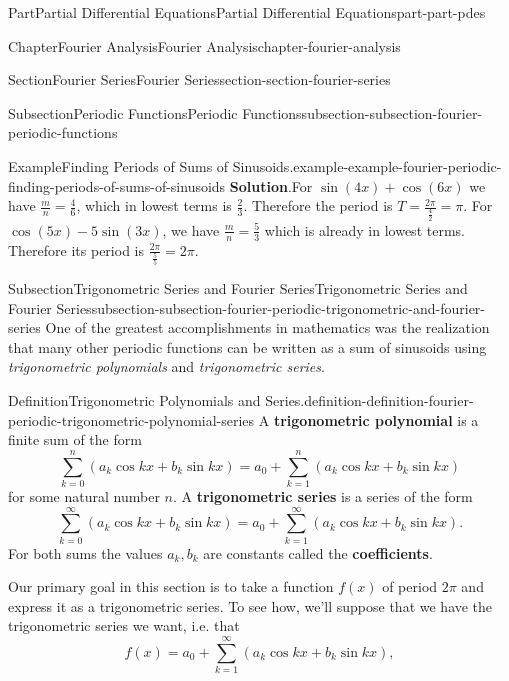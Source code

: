 \documentclass[twoside,10pt,]{book}
\newcommand{\blocktitlefont}{\relax}
\newcommand{\terminology}[1]{\textbf{#1}}
\numberwithin{equation}{part}
\begin{document}
\begin{partptx}{Part}{Partial Differential Equations}{}{Partial Differential Equations}{}{}{part-part-pdes}
\begin{chapterptx}{Chapter}{Fourier Analysis}{}{Fourier Analysis}{}{}{chapter-fourier-analysis}
\begin{sectionptx}{Section}{Fourier Series}{}{Fourier Series}{}{}{section-section-fourier-series}
\begin{subsectionptx}{Subsection}{Periodic Functions}{}{Periodic Functions}{}{}{subsection-subsection-fourier-periodic-functions}
\begin{example}{Example}{Finding Periods of Sums of Sinusoids.}{example-example-fourier-periodic-finding-periods-of-sums-of-sinusoids}
\noindent\textbf{\blocktitlefont Solution}.\hypertarget{solution-example-fourier-periodic-finding-periods-of-sums-of-sinusoids-c}{}\quad{}For \(\sin(4x)+\cos(6x)\) we have \(\frac{m}{n} = \frac{4}{6}\), which in lowest terms is \(\frac{2}{3}\). Therefore the period is \(T = \frac{2\pi}{\frac{4}{2}} = \pi\). For \(\cos(5x) - 5\sin(3x)\), we have \(\frac{m}{n} = \frac{5}{3}\) which is already in lowest terms. Therefore its period is \(\frac{2\pi}{\frac{5}{5}} = 2\pi\).%
\end{example}
\end{subsectionptx}
%
%
\typeout{************************************************}
\typeout{************************************************}
%
\begin{subsectionptx}{Subsection}{Trigonometric Series and Fourier Series}{}{Trigonometric Series and Fourier Series}{}{}{subsection-subsection-fourier-periodic-trigonometric-and-fourier-series}
One of the greatest accomplishments in mathematics was the realization that many other periodic functions can be written as a sum of sinusoids using \emph{trigonometric polynomials} and \emph{trigonometric series}.%
\begin{definition}{Definition}{Trigonometric Polynomials and Series.}{definition-definition-fourier-periodic-trigonometric-polynomial-series}%
%
A \terminology{trigonometric polynomial} is a finite sum of the form%
\begin{equation*}
\sum_{k=0}^{n}(a_{k}\cos kx+b_{k}\sin kx) = a_{0} + \sum_{k=1}^{n}(a_{k}\cos kx+b_{k}\sin kx)
\end{equation*}
for some natural number \(n\). A \terminology{trigonometric series} is a series of the form%
\begin{equation*}
\sum_{k=0}^{\infty}(a_{k}\cos kx+b_{k}\sin kx) = a_{0} + \sum_{k=1}^{\infty}(a_{k}\cos kx+b_{k}\sin kx)\text{.}
\end{equation*}
For both sums the values \(a_{k},b_{k}\) are constants called the \terminology{coefficients}.%
\end{definition}
Our primary goal in this section is to take a function \(f(x)\) of period \(2\pi\) and express it as a trigonometric series. To see how, we'll suppose that we have the trigonometric series we want, i.e. that%
\begin{equation*}
f(x) = a_{0} + \sum_{k=1}^{\infty}(a_{k}\cos kx+b_{k}\sin kx),
\end{equation*}

\end{subsectionptx}
\end{sectionptx}
\end{chapterptx}
\end{partptx}
\end{document}
